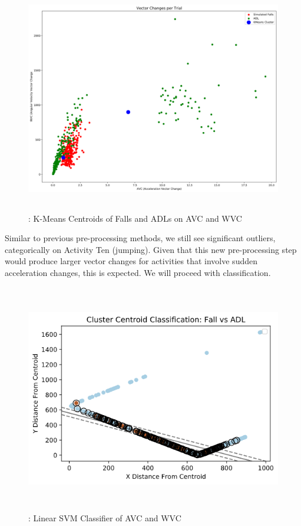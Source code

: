 \documentclass{llncs}
\begin{document}
\begin{figure}
	\centering
	\includegraphics[width=12cm, height=10cm]{images/MaxMagnitudeClustersAVC.png} 
	\caption{: K-Means Centroids of Falls and ADLs on AVC and WVC}
	\label{Figure 4: K-Means Clusters of AVC and WVC Values per Trial}
\end{figure}

	Similar to previous pre-processing methods, we still see significant outliers, categorically on Activity Ten (jumping). Given that this new pre-processing step would produce larger vector changes for activities that involve sudden acceleration changes, this is expected. We will proceed with classification.
	
\begin{figure}
	\centering
	\includegraphics[width=12cm, height=10cm]{images/Classification/linear_classifier_boundary_avc.png} 
	\caption{: Linear SVM Classifier of AVC and WVC}
	\label{Figure 5: Linear SVM Classifier of AVC and WVC Values per Trial}
\end{figure}
        
\end{document}
